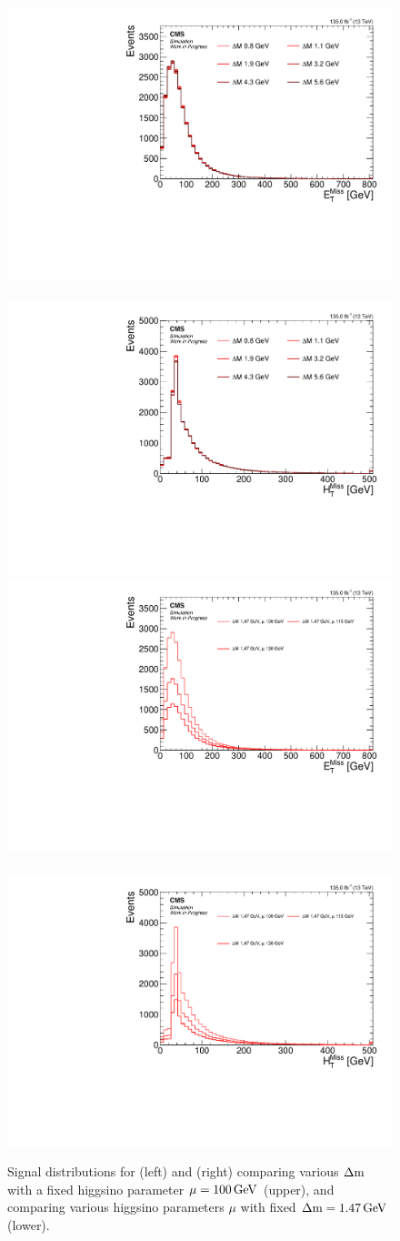 \begin{figure}[h]
\centering
\includegraphics[width=0.48\linewidth]{plots/signal_common_distributions_fixed_mu/none_MET.pdf} \,
\includegraphics[width=0.48\linewidth]{plots/signal_common_distributions_fixed_mu/none_MHT.pdf}  \\
\includegraphics[width=0.48\linewidth]{plots/signal_common_distributions_fixed_dm/none_MET.pdf} \,
\includegraphics[width=0.48\linewidth]{plots/signal_common_distributions_fixed_dm/none_MHT.pdf}  \\
\caption[Signal $\MET$ and $\mht$ distributions]{ Signal distributions for \MET (left) and \mht (right) comparing various $\Delta\mathrm{m}$ with a fixed higgsino parameter $\mu=100\,\text{Ge\hspace{-.08em}V}$ (upper), and comparing various higgsino parameters $\mu$ with fixed $\Delta\mathrm{m}=1.47\,\text{Ge\hspace{-.08em}V}$ (lower).}
\label{fig:signal-met-mht}
\end{figure}

